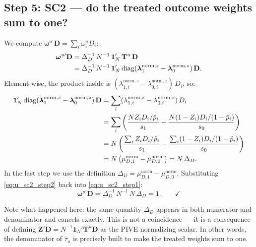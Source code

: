 \documentclass[12pt, a4paper]{article}
\theoremstyle{condstyle}
\theoremstyle{plain}
\newcommand{\bone}{\mathbf{1}_N}
\newcommand{\that}[1]{\hat{\tau}_{#1}}
\newcommand{\phat}{\hat{p}}
\begin{document}
\subsection{Step 5: SC2 --- do the treated outcome weights sum to one?}
\label{ssec:u_sc2}

We compute $\boldsymbol{\omega}^{u\prime}\mathbf{D} = \sum_i \omega_i^u D_i$:
\begin{align}
  \boldsymbol{\omega}^{u\prime}\mathbf{D}
  &= \Delta_D^{-1}\,N^{-1}\,\bone'\,\mathbf{T}^u\,\mathbf{D}
  \notag\\
  &= \Delta_D^{-1}\,N^{-1}\,\bone'\,
     \mathrm{diag}(\boldsymbol{\lambda}_1^{\mathrm{norm},z} - \boldsymbol{\lambda}_0^{\mathrm{norm},z})\,\mathbf{D}.
  \label{eq:u_sc2_step1}
\end{align}
Element-wise, the product inside is
$(\lambda_{1,i}^{\mathrm{norm},z} - \lambda_{0,i}^{\mathrm{norm},z})\,D_i$, so:
\begin{align}
  \bone'\,\mathrm{diag}(\boldsymbol{\lambda}_1^{\mathrm{norm},z} - \boldsymbol{\lambda}_0^{\mathrm{norm},z})\,\mathbf{D}
  &= \sum_i (\lambda_{1,i}^{\mathrm{norm},z} - \lambda_{0,i}^{\mathrm{norm},z})\,D_i
  \notag\\
  &= \sum_i \left(\frac{N Z_i D_i/\phat_i}{s_1} - \frac{N(1-Z_i)D_i/(1-\phat_i)}{s_0}\right)
  \notag\\
  &= N\left(\frac{\sum_i Z_i D_i/\phat_i}{s_1} - \frac{\sum_i (1-Z_i)D_i/(1-\phat_i)}{s_0}\right)
  \notag\\
  &= N\left(\mu_{D,1}^{\mathrm{norm}} - \mu_{D,0}^{\mathrm{norm}}\right)
   = N\,\Delta_D.
  \label{eq:u_sc2_step2}
\end{align}
In the last step we use the definition $\Delta_D = \mu_{D,1}^{\mathrm{norm}} - \mu_{D,0}^{\mathrm{norm}}$.
Substituting \eqref{eq:u_sc2_step2} back into \eqref{eq:u_sc2_step1}:
\begin{equation}
  \boldsymbol{\omega}^{u\prime}\mathbf{D}
  = \Delta_D^{-1}\,N^{-1}\,N\,\Delta_D
  = 1. \qquad\checkmark
  \label{eq:u_treated_sum}
\end{equation}

\medskip\noindent
Note what happened here: the same quantity $\Delta_D$ appears in both numerator
and denominator and cancels exactly.
This is not a coincidence --- it is a consequence of defining
$\tilde{\mathbf{Z}}'\tilde{\mathbf{D}} = N^{-1}\bone'\mathbf{T}^u\mathbf{D}$
as the PIVE normalizing scalar.
In other words, the denominator of $\that{u}$ is precisely built to make the
treated weights sum to one.
\end{document}
